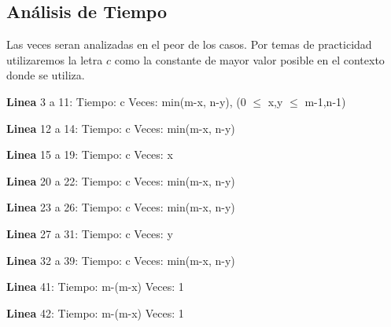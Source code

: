 \documentclass[12pt,a4,paper]{article}
\begin{document}
\subsection*{Análisis de Tiempo}
Las veces seran analizadas en el peor de los casos. Por temas de practicidad utilizaremos la letra $c$ como la constante de mayor valor posible en el contexto donde se utiliza.\newline

\textbf{Linea} 3 a 11:\newline
Tiempo: c \newline
Veces: min(m-x, n-y), (0 $\leq$ x,y $\leq$ m-1,n-1)\newline

\textbf{Linea} 12 a 14:\newline
Tiempo: c \newline
Veces: min(m-x, n-y)\newline

\textbf{Linea} 15 a 19:\newline
Tiempo: c \newline
Veces: x  \newline

\textbf{Linea} 20 a 22:\newline
Tiempo: c \newline
Veces: min(m-x, n-y) \newline

\textbf{Linea} 23 a 26:\newline
Tiempo: c \newline
Veces: min(m-x, n-y) \newline

\textbf{Linea} 27 a 31:\newline
Tiempo: c \newline
Veces: y \newline

\textbf{Linea} 32 a 39:\newline
Tiempo: c \newline
Veces: min(m-x, n-y) \newline

\textbf{Linea} 41:\newline
Tiempo: m-(m-x) \newline
Veces: 1 \newline

\textbf{Linea} 42:\newline
Tiempo: m-(m-x)\newline
Veces: 1 \newline
\end{document}
